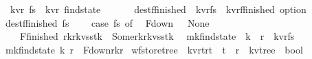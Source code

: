 \begin{isabellebody}
\isamarkupfalse%
\ {\isacharparenleft}{\isacharprime}k{\isacharcomma}{\isacharprime}v{\isacharcomma}{\isacharprime}r{\isacharparenright}\ fs\ {\isacharequal}\ {\isachardoublequoteopen}{\isacharparenleft}{\isacharprime}k{\isacharcomma}{\isacharprime}v{\isacharcomma}{\isacharprime}r{\isacharparenright}\ find{\isacharunderscore}state{\isachardoublequoteclose}\isanewline
\isanewline
\isanewline
\isanewline
\ \ \isanewline
\ \ \isanewline
{}\isamarkupfalse%
\ dest{\isacharunderscore}f{\isacharunderscore}finished\ {\isacharcolon}{\isacharcolon}\ {\isachardoublequoteopen}{\isacharparenleft}{\isacharprime}k{\isacharcomma}{\isacharprime}v{\isacharcomma}{\isacharprime}r{\isacharparenright}fs\ {\isasymRightarrow}\ {\isacharparenleft}{\isacharprime}k{\isacharcomma}{\isacharprime}v{\isacharcomma}{\isacharprime}r{\isacharparenright}f{\isacharunderscore}finished\ option{\isachardoublequoteclose}\ \isanewline
{\isachardoublequoteopen}dest{\isacharunderscore}f{\isacharunderscore}finished\ fs\ {\isacharequal}\ {\isacharparenleft}\isanewline
\ \ case\ fs\ of\isanewline
\ \ F{\isacharunderscore}down\ {\isacharunderscore}\ {\isasymRightarrow}\ None\isanewline
\ \ {\isacharbar}\ F{\isacharunderscore}finished\ {\isacharparenleft}r{}{\isacharcomma}k{\isacharcomma}r{\isacharcomma}kvs{\isacharcomma}stk{\isacharparenright}\ {\isasymRightarrow}\ Some{\isacharparenleft}r{}{\isacharcomma}k{\isacharcomma}r{\isacharcomma}kvs{\isacharcomma}stk{\isacharparenright}\ {\isacharparenright}{\isachardoublequoteclose}\isanewline
\isanewline
\isanewline
\isanewline
{}\isamarkupfalse%
\ mk{\isacharunderscore}find{\isacharunderscore}state\ {\isacharcolon}{\isacharcolon}\ {\isachardoublequoteopen}{\isacharprime}k\ {\isasymRightarrow}\ {\isacharprime}r\ {\isasymRightarrow}\ {\isacharparenleft}{\isacharprime}k{\isacharcomma}{\isacharprime}v{\isacharcomma}{\isacharprime}r{\isacharparenright}fs{\isachardoublequoteclose}\ \isanewline
{\isachardoublequoteopen}mk{\isacharunderscore}find{\isacharunderscore}state\ k\ r\ {\isacharequal}\ F{\isacharunderscore}down{\isacharparenleft}r{\isacharcomma}k{\isacharcomma}r{\isacharcomma}{\isacharbrackleft}{\isacharbrackright}{\isacharparenright}{\isachardoublequoteclose}\isanewline
\isanewline
\isanewline
\isanewline
\isanewline
\isanewline
\isanewline
\isanewline
\isanewline
{}\isamarkupfalse%
\ wf{\isacharunderscore}store{\isacharunderscore}tree\ {\isacharcolon}{\isacharcolon}\ {\isachardoublequoteopen}{\isacharparenleft}{\isacharprime}k{\isacharcomma}{\isacharprime}v{\isacharcomma}{\isacharprime}r{\isacharcomma}{\isacharprime}t{\isacharparenright}r{}t\ {\isasymRightarrow}\ {\isacharprime}t\ {\isasymRightarrow}\ {\isacharprime}r\ {\isasymRightarrow}\ {\isacharparenleft}{\isacharprime}k{\isacharcomma}{\isacharprime}v{\isacharparenright}tree\ {\isasymRightarrow}\ bool{\isachardoublequoteclose}\ \isanewline

\end{isabellebody}

